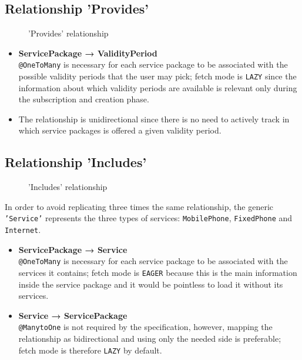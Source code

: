 \subsection*{Relationship 'Provides'}

\begin{minipage}[h]{0.5\textwidth}
    \begin{figure}[H]
        
        \caption{'Provides' relationship}
        \label{fig:orm_sp_vp}
    \end{figure}
\end{minipage}
\hfill
\begin{minipage}[h]{0.48\textwidth}
    \begin{itemize}
        \item \textbf{ServicePackage → ValidityPeriod} \\ \texttt{@OneToMany} is necessary for each service package to be associated with the possible validity periods that the user may pick; fetch mode is \texttt{LAZY} since the information about which validity periods are available is relevant only during the subscription and creation phase.
        \item The relationship is unidirectional since there is no need to actively track in which service packages is offered a given validity period.
    \end{itemize}
\end{minipage}

\subsection*{Relationship 'Includes'}

\begin{minipage}[h]{0.5\textwidth}
    \begin{figure}[H]
        
        \caption{'Includes' relationship}
        \label{fig:orm_sp_s}
    \end{figure}
\end{minipage}
\hfill
\begin{minipage}[h]{0.48\textwidth}
    In order to avoid replicating three times the same relationship, the generic \texttt{'Service'} represents the three types of services: \texttt{MobilePhone}, \texttt{FixedPhone} and \texttt{Internet}.
    \begin{itemize}
        \item \textbf{ServicePackage → Service} \\ \texttt{@OneToMany} is necessary for each service package to be associated with the services it contains; fetch mode is \texttt{EAGER} because this is the main information inside the service package and it would be pointless to load it without its services.
        \item \textbf{Service → ServicePackage} \\ \texttt{@ManytoOne} is not required by the specification, however, mapping the relationship as bidirectional and using only the needed side is preferable; fetch mode is therefore \texttt{LAZY} by default.
    \end{itemize}
\end{minipage}


